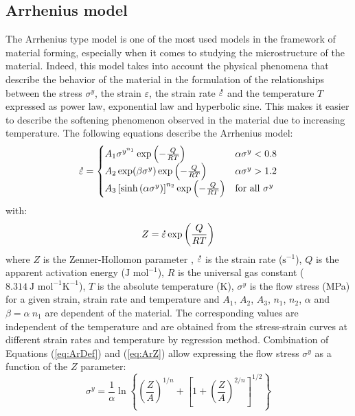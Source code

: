 \documentclass[twoside,english,1p,final,sort&compress]{elsarticle}
\theoremstyle{plain}
\DeclareRobustCommand{\mdot}[1]{\accentset{\mbox{\bfseries .}}{#1}}
\DeclareRobustCommand{\ps}{\text{s}^{-1}}
\begin{document}
\subsection{Arrhenius model\label{sec:ARmodel}}

The Arrhenius type model \cite{Sellars-1966} is one of the most used models in the framework of material forming, especially when it comes to studying the microstructure of the material.
Indeed, this model takes into account the physical phenomena that describe the behavior of the material in the formulation of the relationships between the stress $\sigma^y$, the strain $\varepsilon$, the strain rate $\mdot\varepsilon$ and the temperature $T$ expressed as power law, exponential law and hyperbolic sine.
This makes it easier to describe the softening phenomenon observed in the material due to increasing temperature.
The following equations describe the Arrhenius model:
\begin{equation}
\mdot\varepsilon =
\begin{cases}
A_1 \sigma^{y^{n_1}} \exp{\left(-\frac{Q}{RT}\right)} & \alpha\sigma^y < 0.8\\
A_2 \exp(\beta\sigma^y) \exp{\left(-\frac{Q}{RT}\right)} & \alpha\sigma^y > 1.2\\
A_3 \left[\sinh{\left(\alpha\sigma^y\right)}\right]^{n_2} \exp{\left(-\frac{Q}{RT}\right)} & \text{for all }\sigma^y
\end{cases}
\label{eq:ArDef}
\end{equation}
with:
\begin{equation}
Z = \mdot\varepsilon \exp{\left(\frac{Q}{RT}\right)} \label{eq:ArZ}
\end{equation}
where $Z$ is the Zenner-Hollomon parameter \cite{Zener-1944}, $\mdot\varepsilon$ is the strain rate ($\ps$), $Q$ is the apparent activation energy ($\text{J~mol}^{-1}$), $R$ is the universal gas constant ($8.314~\text{J~mol}^{-1} \text{K}^{-1}$), $T$ is the absolute temperature (K), $\sigma^y$ is the flow stress (MPa) for a given strain, strain rate and temperature and $A_1$, $A_2$, $A_3$, $n_1$, $n_2$, $\alpha$ and $\beta=\alpha~n_1$ are dependent of the material.
The corresponding values are independent of the temperature and are obtained from the stress-strain curves at different strain rates and temperature by regression method.
Combination of Equations (\ref{eq:ArDef}) and (\ref{eq:ArZ}) allow expressing the flow stress $\sigma^y$ as a function of the $Z$ parameter:
\begin{equation}
\sigma^y = \frac{1}{\alpha} \ln\left\{\left(\frac{Z}{A}\right)^{1/n} + \left[1 + \left(\frac{Z}{A}\right)^{2/n}\right]^{1/2}\right\}
\end{equation}
\end{document}
